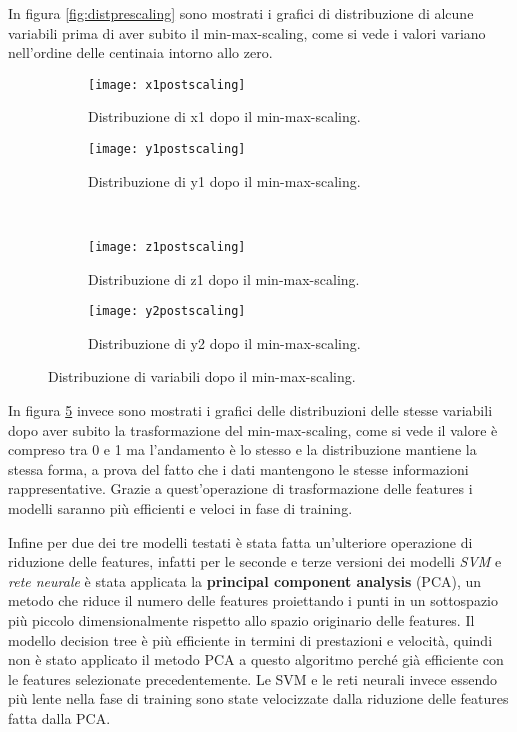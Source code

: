 In figura \ref{fig:distprescaling} sono mostrati i grafici di distribuzione di alcune variabili prima di aver subito il min-max-scaling, come si vede i valori variano nell'ordine delle centinaia intorno allo zero.

\begin{figure}[ht]
    \centering
    \begin{subfigure}[t]{0.4\textwidth}
        \centering\texttt{[image: x1postscaling]}
        \caption{Distribuzione di x1 dopo il min-max-scaling.}
        \label{fig:distpostscaling:x1}
    \end{subfigure}
    \begin{subfigure}[t]{0.4\textwidth}
        \centering\texttt{[image: y1postscaling]}
        \caption{Distribuzione di y1 dopo il min-max-scaling.}
        \label{fig:distpostscaling:y1}
    \end{subfigure}
    \\
    \begin{subfigure}[t]{0.4\textwidth}
        \centering\texttt{[image: z1postscaling]}
        \caption{Distribuzione di z1 dopo il min-max-scaling.}
        \label{fig:distpostscaling:z1}
    \end{subfigure}
    \begin{subfigure}[t]{0.4\textwidth}
        \centering\texttt{[image: y2postscaling]}
        \caption{Distribuzione di y2 dopo il min-max-scaling.}
        \label{fig:distpostscaling:y2}
    \end{subfigure}
    \caption{Distribuzione di variabili dopo il min-max-scaling.}
    \label{fig:distpostscaling}
\end{figure}

In figura \ref{fig:distpostscaling} invece sono mostrati i grafici delle distribuzioni delle stesse variabili dopo aver subito la trasformazione del min-max-scaling, come si vede il valore è compreso tra 0 e 1 ma l'andamento è lo stesso e la distribuzione mantiene la stessa forma, a prova del fatto che i dati mantengono le stesse informazioni rappresentative. Grazie a quest'operazione di trasformazione delle features i modelli saranno più efficienti e veloci in fase di training.

Infine per due dei tre modelli testati è stata fatta un'ulteriore operazione di riduzione delle features, infatti per le seconde e terze versioni dei modelli \textit{SVM} e \textit{rete neurale} è stata applicata la \textbf{principal component analysis} (PCA), un metodo che riduce il numero delle features proiettando i punti in un sottospazio più piccolo dimensionalmente rispetto allo spazio originario delle features. Il modello decision tree è più efficiente in termini di prestazioni e velocità, quindi non è stato applicato il metodo PCA a questo algoritmo perché già efficiente con le features selezionate precedentemente. Le SVM e le reti neurali invece essendo più lente nella fase di training sono state velocizzate dalla riduzione delle features fatta dalla PCA. 

